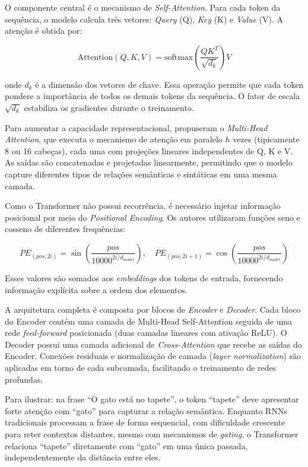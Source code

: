 \documentclass[
    12pt,                %
    openright,           %
    oneside,             %
    a4paper,             %
    english,             %
    brazil               %
]{abntex2}
\begin{document}
O componente central é o mecanismo de \textit{Self-Attention}. Para cada token da sequência, o modelo calcula três vetores: \textit{Query} (Q), \textit{Key} (K) e \textit{Value} (V). A atenção é obtida por:

\[
\text{Attention}(Q, K, V) = \text{softmax}\left(\frac{QK^T}{\sqrt{d_k}}\right)V
\]

onde \(d_k\) é a dimensão dos vetores de chave. Essa operação permite que cada token pondere a importância de todos os demais tokens da sequência. O fator de escala \(\sqrt{d_k}\) estabiliza os gradientes durante o treinamento.

Para aumentar a capacidade representacional,  propuseram o \textit{Multi-Head Attention}, que executa o mecanismo de atenção em paralelo \(h\) vezes (tipicamente 8 ou 16 cabeças), cada uma com projeções lineares independentes de Q, K e V. As saídas são concatenadas e projetadas linearmente, permitindo que o modelo capture diferentes tipos de relações semânticas e sintáticas em uma mesma camada.

Como o Transformer não possui recorrência, é necessário injetar informação posicional por meio do \textit{Positional Encoding}. Os autores utilizaram funções seno e cosseno de diferentes frequências:

\[
PE_{(pos,2i)} = \sin\left(\frac{pos}{10000^{2i/d_{model}}}\right), \quad PE_{(pos,2i+1)} = \cos\left(\frac{pos}{10000^{2i/d_{model}}}\right)
\]

Esses valores são somados aos \textit{embeddings} dos tokens de entrada, fornecendo informação explícita sobre a ordem dos elementos.

A arquitetura completa é composta por blocos de \textit{Encoder} e \textit{Decoder}. Cada bloco do Encoder contém uma camada de Multi-Head Self-Attention seguida de uma rede \textit{feed-forward} posicionada (duas camadas lineares com ativação ReLU). O Decoder possui uma camada adicional de \textit{Cross-Attention} que recebe as saídas do Encoder. Conexões residuais e normalização de camada (\textit{layer normalization}) são aplicadas em torno de cada subcamada, facilitando o treinamento de redes profundas.

Para ilustrar: na frase ``O gato está no tapete'', o token ``tapete'' deve apresentar forte atenção com ``gato'' para capturar a relação semântica. Enquanto RNNs tradicionais processam a frase de forma sequencial, com dificuldade crescente para reter contextos distantes, mesmo com mecanismos de \textit{gating}, o Transformer relaciona ``tapete'' diretamente com ``gato'' em uma única passada, independentemente da distância entre eles.
\end{document}
